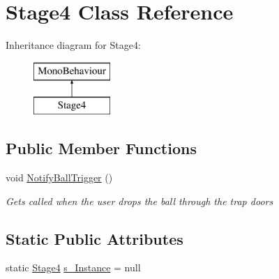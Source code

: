 \hypertarget{class_stage4}{}\section{Stage4 Class Reference}
\label{class_stage4}
Inheritance diagram for Stage4\+:\begin{figure}[H]
\begin{center}
\leavevmode
\includegraphics[height=2.000000cm]{class_stage4}
\end{center}
\end{figure}
\subsection*{Public Member Functions}
\begin{DoxyCompactItemize}
\item 
void \mbox{\hyperlink{class_stage4_a3b96ad980e2129d1fcb619673921c233}{Notify\+Ball\+Trigger}} ()
\begin{DoxyCompactList}\small\item\em Gets called when the user drops the ball through the trap doors \end{DoxyCompactList}\end{DoxyCompactItemize}
\subsection*{Static Public Attributes}
\begin{DoxyCompactItemize}
\item 
static \mbox{\hyperlink{class_stage4}{Stage4}} \mbox{\hyperlink{class_stage4_a34780e013df9edac711f8b62d9c9a629}{s\+\_\+\+Instance}} = null
\end{DoxyCompactItemize}
